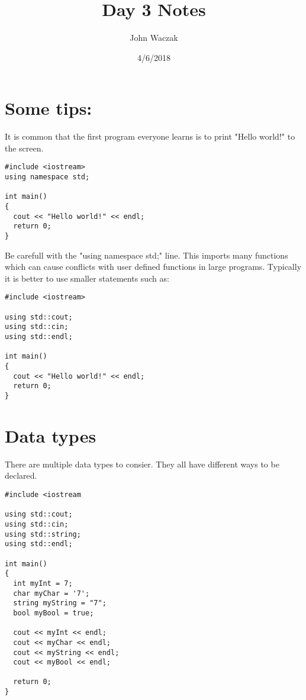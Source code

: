 \documentclass[11pt]{article}
\author{John Waczak}
\date{4/6/2018}
\title{Day 3 Notes}
\begin{document}
\maketitle

\section{Some tips:}
\label{sec-1}
It is common that the first program everyone learns is to print
"Hello world!" to the screen.

\begin{verbatim}
#include <iostream>
using namespace std;

int main()
{
  cout << "Hello world!" << endl;
  return 0;
}
\end{verbatim}

Be carefull with the "using namespace std;" line. This imports many
functions which can cause conflicts with user defined functions in
large programs. Typically it is better to use smaller statements
such as:

\begin{verbatim}
#include <iostream>

using std::cout;
using std::cin;
using std::endl;

int main()
{
  cout << "Hello world!" << endl;
  return 0;
}
\end{verbatim}

\section{Data types}
\label{sec-2}
There are multiple data types to consier. They all have different
ways to be declared.

\begin{verbatim}
#include <iostream

using std::cout;
using std::cin;
using std::string;
using std::endl;

int main()
{
  int myInt = 7;
  char myChar = '7';
  string myString = "7";
  bool myBool = true;

  cout << myInt << endl;
  cout << myChar << endl;
  cout << myString << endl;
  cout << myBool << endl;

  return 0;
}
\end{verbatim}
\end{document}
